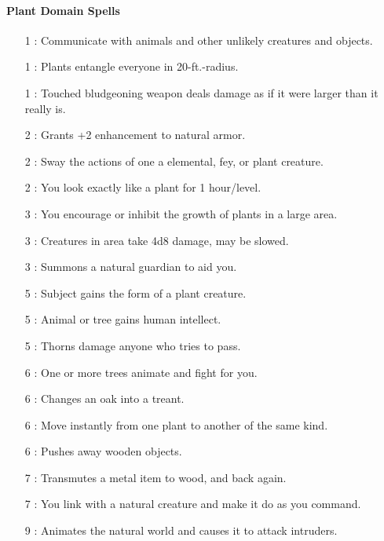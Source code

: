 \paragraph{Plant Domain Spells}
\begin{itemize}
\item[1] : Communicate with animals and other unlikely creatures and objects.
\item[1] : Plants entangle everyone in 20-ft.-radius.
\item[1] : Touched bludgeoning weapon deals damage as if it were larger than it really is.
\item[2] : Grants +2 enhancement to natural armor.
\item[2] : Sway the actions of one a elemental, fey, or plant creature.
\item[2] : You look exactly like a plant for 1 hour/level.
\item[3] : You encourage or inhibit the growth of plants in a large area.
\item[3] : Creatures in area take 4d8 damage, may be slowed.
\item[3] : Summons a natural guardian to aid you.
\item[5] : Subject gains the form of a plant creature.
\item[5] : Animal or tree gains human intellect.
\item[5] : Thorns damage anyone who tries to pass.
\item[6] : One or more trees animate and fight for you.
\item[6] : Changes an oak into a treant.
\item[6] : Move instantly from one plant to another of the same kind.
\item[6] : Pushes away wooden objects.
\item[7] : Transmutes a metal item to wood, and back again.
\item[7] : You link with a natural creature and make it do as you command.
\item[9] : Animates the natural world and causes it to attack intruders.
\end{itemize}
